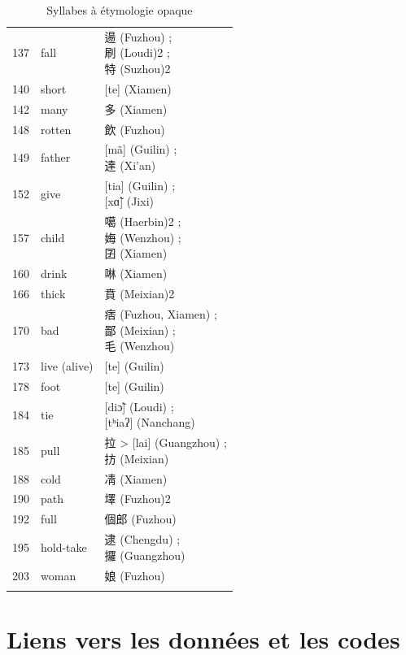 \documentclass{scrbook}
\newcounter{c}[subsubsection]
\begin{document}
\begin{sloppypar}
\begin{appendices}
\begin{longtable}[htbp]{lll}
    137   & fall  & \makecell[l]{逿 (Fuzhou) ; \\刷 (Loudi)2 ; \\特 (Suzhou)2} \\
    140   & short & [te] (Xiamen) \\
    142   & many  & 多 (Xiamen) \\
    148   & rotten & 飲 (Fuzhou) \\
    149   & father & \makecell[l]{{[mã]} (Guilin) ; \\達 (Xi'an)} \\
    152   & give  & \makecell[l]{{[tia]} (Guilin) ; \\{[xɑ̃]} (Jixi)} \\
    157   & child & \makecell[l]{噶 (Haerbin)2 ; \\娒 (Wenzhou) ; \\囝 (Xiamen)} \\
    160   & drink & 啉 (Xiamen) \\
    166   & thick & 賁 (Meixian)2 \\
    170   & bad   & \makecell[l]{痞 (Fuzhou, Xiamen) ; \\鄙 (Meixian) ; \\毛 (Wenzhou)} \\
    173   & live (alive) & [te] (Guilin) \\
    178   & foot  & [te] (Guilin) \\
    184   & tie   & \makecell[l]{{[diɔ̃]} (Loudi) ; \\{[tʰiaʔ]} (Nanchang)} \\
    185   & pull  & \makecell[l]{拉 > [lai] (Guangzhou) ; \\㧍 (Meixian)} \\
    188   & cold  & 凊 (Xiamen) \\
    190   & path  & 墿 (Fuzhou)2 \\
    192   & full  & 個郎 (Fuzhou) \\
    195   & hold-take & \makecell[l]{逮 (Chengdu) ; \\攞 (Guangzhou)} \\
    203   & woman & 娘 (Fuzhou) \\
    \bottomrule
  \caption{Syllabes à étymologie opaque}
  \label{tab:addlabel}%
\end{longtable}%

\chapter{Liens vers les données et les codes}\label{appendice4}


\end{appendices}
\end{sloppypar}
\end{document}
